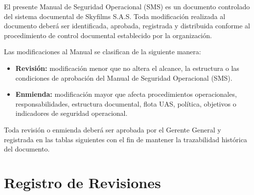 

El presente Manual de Seguridad Operacional (SMS) es un documento controlado del sistema documental de Skyfilms S.A.S. Toda modificación realizada al documento deberá ser identificada, aprobada, registrada y distribuida conforme al procedimiento de control documental establecido por la organización.

Las modificaciones al Manual se clasifican de la siguiente manera:

\begin{itemize}
    \item \textbf{Revisión:} modificación menor que no altera el alcance, la estructura o las condiciones de aprobación del Manual de Seguridad Operacional (SMS).
    
    \item \textbf{Enmienda:} modificación mayor que afecta procedimientos operacionales, responsabilidades, estructura documental, flota UAS, política, objetivos o indicadores de seguridad operacional.
\end{itemize}

Toda revisión o enmienda deberá ser aprobada por el Gerente General y registrada en las tablas siguientes con el fin de mantener la trazabilidad histórica del documento.

\vspace{0.7cm}


\section*{Registro de Revisiones}

\renewcommand{\arraystretch}{1.35}

